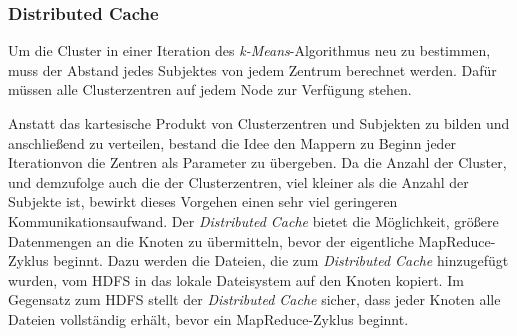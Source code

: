 \documentclass[a4paper]{llncs}
\begin{document}

\subsubsection{Distributed Cache}

Um die Cluster in einer Iteration des \emph{k-Means}-Algorithmus neu zu bestimmen, muss der Abstand jedes Subjektes von jedem Zentrum berechnet werden. Dafür müssen alle Clusterzentren auf jedem Node zur Verfügung stehen.

Anstatt das kartesische Produkt von Clusterzentren und Subjekten zu bilden und anschließend zu verteilen, bestand die Idee den Mappern zu Beginn jeder Iterationvon die Zentren als Parameter zu übergeben. Da die Anzahl der Cluster, und demzufolge auch die der Clusterzentren, viel kleiner als die Anzahl der Subjekte ist, bewirkt dieses Vorgehen einen sehr viel geringeren Kommunikationsaufwand.
Der \emph{Distributed Cache} bietet die Möglichkeit, größere Datenmengen an die Knoten zu übermitteln, bevor der eigentliche MapReduce-Zyklus beginnt. Dazu werden die Dateien, die zum \emph{Distributed Cache} hinzugefügt wurden, vom HDFS in das lokale Dateisystem auf den Knoten kopiert. Im Gegensatz zum HDFS stellt der \emph{Distributed Cache} sicher, dass jeder Knoten alle Dateien vollständig erhält, bevor ein MapReduce-Zyklus beginnt.

\end{document}
